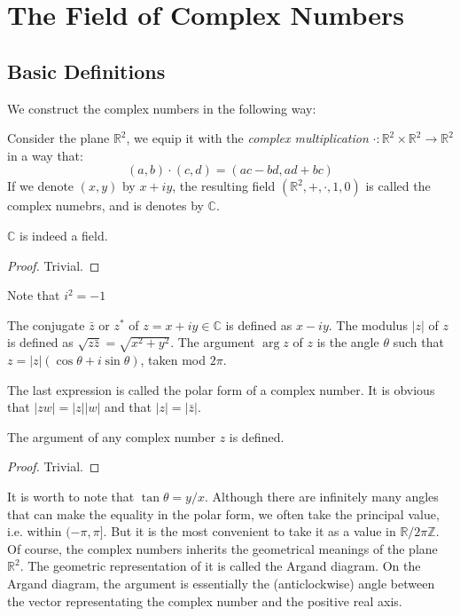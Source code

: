 \section{The Field of Complex Numbers}
\subsection{Basic Definitions}
We construct the complex numbers in the following way:
\begin{definition}
    Consider the plane $\mathbb R^2$, we equip it with the \textit{complex multiplication} $\cdot:\mathbb R^2\times\mathbb R^2\to\mathbb R^2$ in a way that:
    $$(a,b)\cdot(c,d)=(ac-bd,ad+bc)$$
    If we denote $(x,y)$ by $x+iy$, the resulting field $(\mathbb R^2, +, \cdot, 1, 0)$ is called the complex numebrs, and is denotes by $\mathbb C$.
\end{definition}
\begin{proposition}
    $\mathbb C$ is indeed a field.
\end{proposition}
\begin{proof}
    Trivial.
\end{proof}
Note that $i^2=-1$
\begin{definition}
    The conjugate $\bar z$ or $z^*$ of $z=x+iy\in\mathbb C$ is defined as $x-iy$.
    The modulus $|z|$ of $z$ is defined as $\sqrt{z\bar z}=\sqrt{x^2+y^2}$.
    The argument $\arg z$ of $z$ is the angle $\theta$ such that $z=|z|(\cos\theta+i\sin\theta)$, taken mod $2\pi$.
\end{definition}
The last expression is called the polar form of a complex number.
It is obvious that $|zw|=|z||w|$ and that $|z|=|\bar z|$.
\begin{claim}
    The argument of any complex number $z$ is defined.
\end{claim}
\begin{proof}
    Trivial.
\end{proof}
It is worth to note that $\tan\theta = y/x$.
Although there are infinitely many angles that can make the equality in the polar form, we often take the principal value, i.e. within $(-\pi,\pi]$.
But it is the most convenient to take it as a value in $\mathbb R/2\pi\mathbb Z$.\\
Of course, the complex numbers inherits the geometrical meanings of the plane $\mathbb R^2$. The geometric representation of it is called the Argand diagram.
On the Argand diagram, the argument is essentially the (anticlockwise) angle between the vector representating the complex number and the positive real axis.
